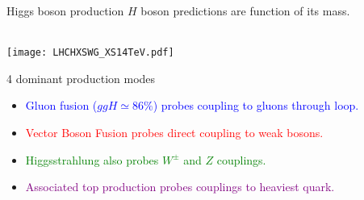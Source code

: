 \begin{frame}{Higgs boson production}
  $H$ boson predictions are function of its mass.
  
  \begin{minipage}{0.44\linewidth}
    \centering
    \\
    \texttt{[image: LHCHXSWG\_XS14TeV.pdf]}
  \end{minipage}
  \hfill
  \begin{minipage}{0.55\linewidth}
    4 dominant production modes
    \begin{itemize}
    \item \textcolor{blue}{Gluon fusion ($ggH\simeq 86\%$) probes coupling to gluons through loop.}
    \item \textcolor{red}{Vector Boson Fusion probes direct coupling to weak bosons.}
    \item \textcolor{green}{Higgsstrahlung also probes $W^\pm$ and $Z$ couplings.}
    \item \textcolor{purple}{Associated top production probes couplings to heaviest quark.}
    \end{itemize}
  \end{minipage}
\end{frame}

